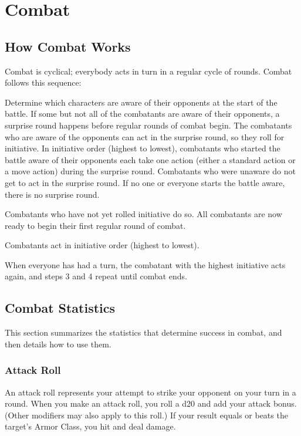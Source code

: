 \chapter{Combat}\label{Combat}

\section{How Combat Works}
Combat is cyclical; everybody acts in turn in a regular cycle of rounds. Combat follows this sequence:
\begin{enumerate*}
\item Determine which characters are aware of their opponents at the start of the battle. If some but not all of the combatants are aware of their opponents, a surprise round happens before regular rounds of combat begin. The combatants who are aware of the opponents can act in the surprise round, so they roll for initiative. In initiative order (highest to lowest), combatants who started the battle aware of their opponents each take one action (either a standard action or a move action) during the surprise round. Combatants who were unaware do not get to act in the surprise round. If no one or everyone starts the battle aware, there is no surprise round.
\item Combatants who have not yet rolled initiative do so. All combatants are now ready to begin their first regular round of combat.
\item Combatants act in initiative order (highest to lowest).
\item When everyone has had a turn, the combatant with the highest initiative acts again, and steps 3 and 4 repeat until combat ends.
\end{enumerate*}

\section{Combat Statistics}
This section summarizes the statistics that determine success in combat, and then details how to use them.

\subsection{Attack Roll}
An attack roll represents your attempt to strike your opponent on your turn in a round. When you make an attack roll, you roll a d20 and add your attack bonus. (Other modifiers may also apply to this roll.) If your result equals or beats the target's Armor Class, you hit and deal damage.

